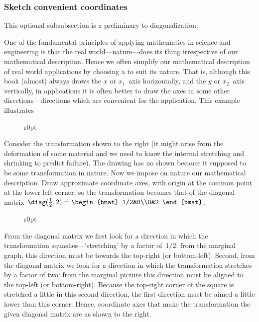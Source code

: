 \begin{reduce}
\subsubsection{Sketch convenient coordinates}
This optional subsubsection is a preliminary to diagonalization.

One of the fundamental principles of applying mathematics in science and engineering
is that the real world---nature---does its thing irrespective of our mathematical description.
Hence we often simplify our mathematical description of real world applications by choosing a  to suit its nature.
That is, although this book (almost) always draws the \(x\) or \(x_1\)~axis horizontally, and the \(y\) or \(x_2\)~axis vertically, in applications it is often better to draw the axes in some other  directions---directions which are convenient for the application.
This example illustrates 


\begin{wrapfigure}r{0pt} 
\end{wrapfigure}
\begin{example} 
Consider the transformation shown to the right (it might arise from the deformation of some material and we need to know the internal stretching and shrinking to predict failure).
The drawing has no  shown because it supposed to be some transformation in nature. 
Now we impose on nature our mathematical description.
Draw approximate coordinate axes, with origin at the common point at the lower-left corner, so the transformation becomes that of the diagonal matrix \(\diag(\frac12,2)=\begin{bmat} 1/2&0\\0&2 \end{bmat}\).

\begin{wrapfigure}r{0pt}
\end{wrapfigure}
\begin{solution} 
From the diagonal matrix we first look for a direction in which the transformation squashes---`stretching' by a factor of~\(1/2\): from the marginal graph, this direction must be towards the top-right (or bottom-left).
Second, from the diagonal matrix we look for a direction in which the transformation stretches by a factor of two: from the marginal picture this direction must be aligned to the top-left (or bottom-right).
Because the top-right corner of the square is stretched a little in this second direction, the first direction must be aimed a little lower than this corner.
Hence, coordinate axes that make the transformation the given diagonal matrix are as shown to the right. 
\aqed


\end{solution}
\end{example}
\end{reduce}
